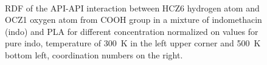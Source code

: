 \begin{figure}[htb!]
	\centering
	\\
	\vspace{-0.1cm}
	\vspace{-0.4cm}
	\caption{RDF of the API-API interaction between HCZ6 hydrogen atom and OCZ1 oxygen atom from COOH group in a mixture of indomethacin (indo) and PLA for different concentration normalized on values for pure indo, temperature of 300~K in the left upper corner and 500~K bottom left, coordination numbers on the right.}
	\label{fig:indo_RDF_}
	\vspace{-0.2cm}
\end{figure}


